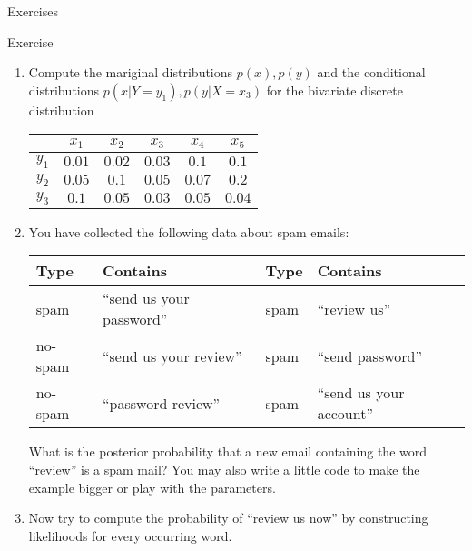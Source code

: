  \begin{frame}{Exercises}
    \begin{exampleblock}{Exercise}
      \begin{enumerate}
        \item Compute the mariginal distributions $p(x), p(y)$ and the conditional distributions $p(x|Y=y_1), p(y|X=x_3)$ for the bivariate discrete distribution
        \begin{center}
          \begin{tabular}{r|ccccc}
             & $x_1$ & $x_2$ & $x_3$ & $x_4$ & $x_5$ \\ \hline
            $y_1$ & $0.01$ & $0.02$ & $0.03$ & $0.1$ & $0.1$ \\
            $y_2$ & $0.05$ & $0.1$ & $0.05$ & $0.07$ & $0.2$ \\
            $y_3$ & $0.1$ & $0.05$ & $0.03$ & $0.05$ & $0.04$ \\
          \end{tabular}
        \end{center}
        \item You have collected the following data about spam emails:
        \begin{center}
          \begin{tabular}{ll|ll}
            Type & Contains & Type & Contains \\ \hline
            spam & \enquote{send us your password} &
              spam & \enquote{review us} \\
            no-spam & \enquote{send us your review} &
              spam & \enquote{send password} \\
            no-spam & \enquote{password review} &
              spam & \enquote{send us your account} \\
          \end{tabular}
        \end{center}
          What is the posterior probability that a new email containing the word \enquote{review} is a spam mail?
          You may also write a little code to make the example bigger or play with the parameters.
        \item Now try to compute the probability of \enquote{review us now} by constructing likelihoods for every occurring word.
      \end{enumerate}
    \end{exampleblock}
  \end{frame}

